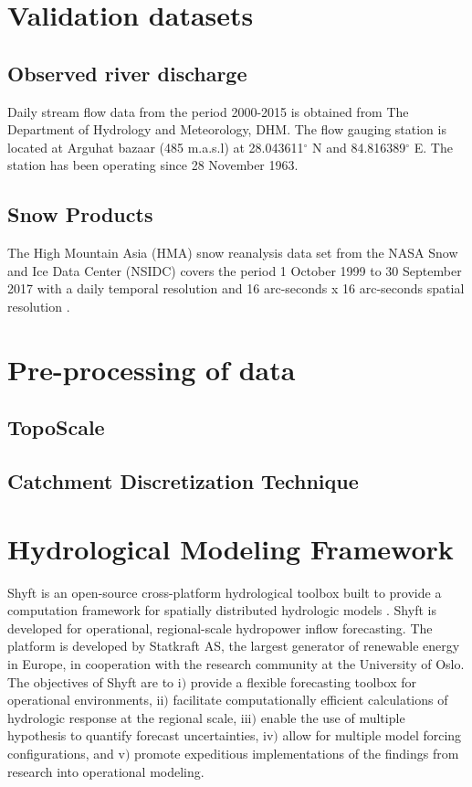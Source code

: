 \section{Validation datasets}

\subsection{Observed river discharge} 

Daily stream flow data from the period 2000-2015 is obtained from The Department of Hydrology and Meteorology, DHM. The  flow gauging station is located at Arguhat bazaar (485 m.a.s.l) at 28.043611$^{\circ}$ N and 84.816389$^{\circ}$ E. The station has been operating since 28 November 1963. 

\subsection{Snow Products}

The High Mountain Asia (HMA) snow reanalysis data set from the NASA Snow and Ice Data Center (NSIDC) covers the period 1 October 1999 to 30 September 2017 with a daily temporal resolution and 16 arc-seconds x 16 arc-seconds spatial resolution \parencite{Liu_2021}. 


\section{Pre-processing of data}

\subsection{TopoScale}

\subsection{Catchment Discretization Technique}


\section{Hydrological Modeling Framework}


Shyft is an open-source cross-platform hydrological toolbox built to provide a computation framework for spatially distributed hydrologic models \parencite{burkhart_shyft_2021}. Shyft is developed for operational, regional-scale hydropower inflow forecasting. The platform is developed by Statkraft AS, the largest generator of renewable energy in Europe, in cooperation with the research community at the University of Oslo. The objectives of Shyft are to i$)$ provide a flexible forecasting toolbox for operational environments, ii$)$ facilitate computationally efficient calculations of hydrologic response at the regional scale, iii$)$ enable the use of multiple hypothesis to quantify forecast uncertainties, iv$)$ allow for multiple model forcing configurations, and v$)$ promote expeditious implementations of the findings from research into operational modeling. 


